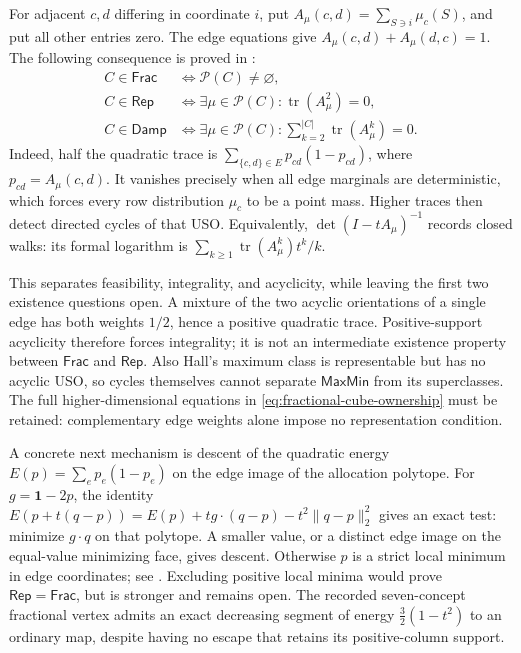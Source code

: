 \documentclass[11pt]{article}
\theoremstyle{definition}
\newcommand{\MaxMin}{\mathsf{MaxMin}}
\newcommand{\Damp}{\mathsf{Damp}}
\newcommand{\Rep}{\mathsf{Rep}}
\newcommand{\Frac}{\mathsf{Frac}}
\begin{document}
For adjacent $c,d$ differing in coordinate $i$, put
$A_\mu(c,d)=\sum_{S\ni i}\mu_c(S)$, and put all other entries zero.
The edge equations give $A_\mu(c,d)+A_\mu(d,c)=1$.
The following consequence is proved in
\cite[Proposition~\textnormal{Edge integrality and closed walks}]{AlgebraicAmple}:
\begin{align*}
 C\in\Frac &\iff \mathcal P(C)\ne\varnothing,\\
 C\in\Rep &\iff \exists\mu\in\mathcal P(C):
                    \operatorname{tr}(A_\mu^2)=0,\\
 C\in\Damp &\iff \exists\mu\in\mathcal P(C):
             \sum_{k=2}^{|C|}\operatorname{tr}(A_\mu^k)=0.
\end{align*}
Indeed, half the quadratic trace is
$\sum_{\{c,d\}\in E}p_{cd}(1-p_{cd})$, where $p_{cd}=A_\mu(c,d)$.
It vanishes precisely when all edge marginals are deterministic, which
forces every row distribution $\mu_c$ to be a point mass. Higher traces
then detect directed cycles of that USO. Equivalently,
$\det(I-tA_\mu)^{-1}$ records closed walks: its formal logarithm is
$\sum_{k\ge1}\operatorname{tr}(A_\mu^k)t^k/k$.

This separates feasibility, integrality, and acyclicity, while leaving
the first two existence questions open. A mixture of the two acyclic
orientations of a single edge has both weights $1/2$, hence a positive
quadratic trace. Positive-support acyclicity therefore forces integrality;
it is not an intermediate existence property between $\Frac$ and $\Rep$.
Also Hall's maximum class is representable but has no acyclic USO, so
cycles themselves cannot separate $\MaxMin$ from its superclasses.
The full higher-dimensional equations in
\eqref{eq:fractional-cube-ownership} must be retained: complementary
edge weights alone impose no representation condition.

A concrete next mechanism is descent of the quadratic energy
$E(p)=\sum_e p_e(1-p_e)$ on the edge image of the allocation polytope.
For $g=\mathbf1-2p$, the identity
$E(p+t(q-p))=E(p)+t g\cdot(q-p)-t^2\|q-p\|_2^2$
gives an exact test: minimize $g\cdot q$ on that polytope. A smaller
value, or a distinct edge image on the equal-value minimizing face,
gives descent. Otherwise $p$ is a strict local minimum in edge
coordinates; see \cite[Proposition~\textnormal{Descent or a strict local
minimum in edge coordinates}]{AlgebraicAmple}. Excluding positive local
minima would prove $\Rep=\Frac$, but is stronger and remains open.
The recorded seven-concept fractional vertex admits an exact decreasing
segment of energy $\frac32(1-t^2)$ to an ordinary map, despite having
no escape that retains its positive-column support.
\end{document}
